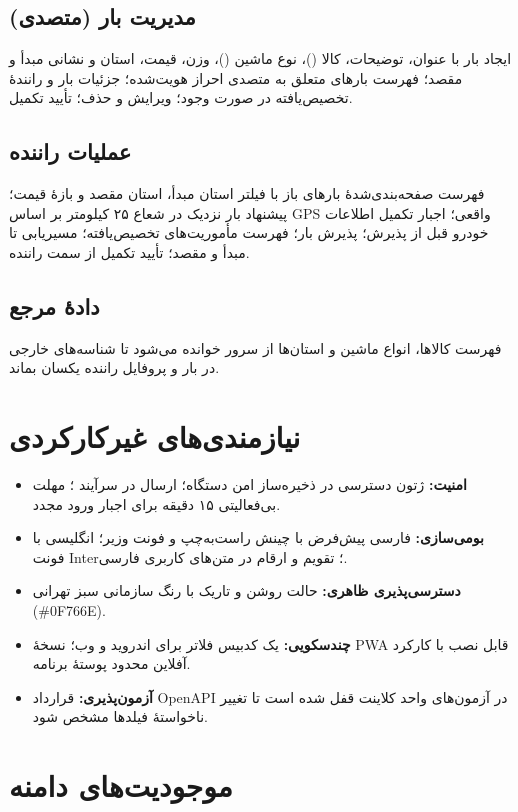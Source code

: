 \subsection{مدیریت بار (متصدی)}
ایجاد بار با عنوان، توضیحات، کالا ()، نوع ماشین ()، وزن، قیمت، استان و نشانی مبدأ و مقصد؛ فهرست بارهای متعلق به متصدی احراز هویت‌شده؛ جزئیات بار و رانندهٔ تخصیص‌یافته در صورت وجود؛ ویرایش و حذف؛ تأیید تکمیل.

\subsection{عملیات راننده}
فهرست صفحه‌بندی‌شدهٔ بارهای باز با فیلتر استان مبدأ، استان مقصد و بازهٔ قیمت؛ پیشنهاد بار نزدیک در شعاع ۲۵ کیلومتر بر اساس \textenglish{GPS} واقعی؛ اجبار تکمیل اطلاعات خودرو قبل از پذیرش؛ پذیرش بار؛ فهرست مأموریت‌های تخصیص‌یافته؛ مسیریابی تا مبدأ و مقصد؛ تأیید تکمیل از سمت راننده.

\subsection{دادهٔ مرجع}
فهرست کالاها، انواع ماشین و استان‌ها از سرور خوانده می‌شود تا شناسه‌های خارجی در بار و پروفایل راننده یکسان بماند.

\section{نیازمندی‌های غیرکارکردی}

\begin{itemize}
  \item \textbf{امنیت:} ژتون دسترسی در ذخیره‌ساز امن دستگاه؛ ارسال در سرآیند ؛ مهلت بی‌فعالیتی ۱۵ دقیقه برای اجبار ورود مجدد.
  \item \textbf{بومی‌سازی:} فارسی پیش‌فرض با چینش راست‌به‌چپ و فونت وزیر؛ انگلیسی با فونت \textenglish{Inter}؛ تقویم و ارقام در متن‌های کاربری فارسی.
  \item \textbf{دسترسی‌پذیری ظاهری:} حالت روشن و تاریک با رنگ سازمانی سبز تهرانی (\textenglish{\#0F766E}).
  \item \textbf{چندسکویی:} یک کدبیس فلاتر برای اندروید و وب؛ نسخهٔ \textenglish{PWA} قابل نصب با کارکرد آفلاین محدود پوستهٔ برنامه.
  \item \textbf{آزمون‌پذیری:} قرارداد \textenglish{OpenAPI} در آزمون‌های واحد کلاینت قفل شده است تا تغییر ناخواستهٔ فیلدها مشخص شود.
\end{itemize}

\section{موجودیت‌های دامنه}

